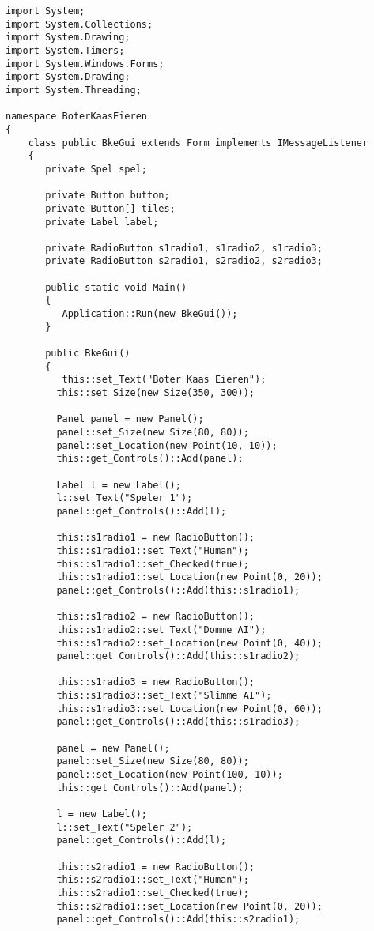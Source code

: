 \begin{lstlisting}
import System;
import System.Collections;
import System.Drawing;
import System.Timers;
import System.Windows.Forms;
import System.Drawing;
import System.Threading;

namespace BoterKaasEieren
{
	class public BkeGui extends Form implements IMessageListener
	{
	   private Spel spel;
	   
	   private Button button;
	   private Button[] tiles;
	   private Label label;
	   
	   private RadioButton s1radio1, s1radio2, s1radio3;
	   private RadioButton s2radio1, s2radio2, s2radio3;
	   
	   public static void Main()
	   {
	      Application::Run(new BkeGui());
	   }
	   
	   public BkeGui()
	   {  
	      this::set_Text("Boter Kaas Eieren");
         this::set_Size(new Size(350, 300));

         Panel panel = new Panel();
         panel::set_Size(new Size(80, 80));
         panel::set_Location(new Point(10, 10));
         this::get_Controls()::Add(panel);
         
         Label l = new Label();
         l::set_Text("Speler 1");
         panel::get_Controls()::Add(l);
         
         this::s1radio1 = new RadioButton();
         this::s1radio1::set_Text("Human");
         this::s1radio1::set_Checked(true);
         this::s1radio1::set_Location(new Point(0, 20));
         panel::get_Controls()::Add(this::s1radio1);

         this::s1radio2 = new RadioButton();
         this::s1radio2::set_Text("Domme AI");
         this::s1radio2::set_Location(new Point(0, 40));
         panel::get_Controls()::Add(this::s1radio2);
         
         this::s1radio3 = new RadioButton();
         this::s1radio3::set_Text("Slimme AI");
         this::s1radio3::set_Location(new Point(0, 60));
         panel::get_Controls()::Add(this::s1radio3);
                 
         panel = new Panel();
         panel::set_Size(new Size(80, 80));
         panel::set_Location(new Point(100, 10));
         this::get_Controls()::Add(panel);
         
         l = new Label();
         l::set_Text("Speler 2");
         panel::get_Controls()::Add(l);
         
         this::s2radio1 = new RadioButton();
         this::s2radio1::set_Text("Human");
         this::s2radio1::set_Checked(true);
         this::s2radio1::set_Location(new Point(0, 20));
         panel::get_Controls()::Add(this::s2radio1);


\end{lstlisting}
